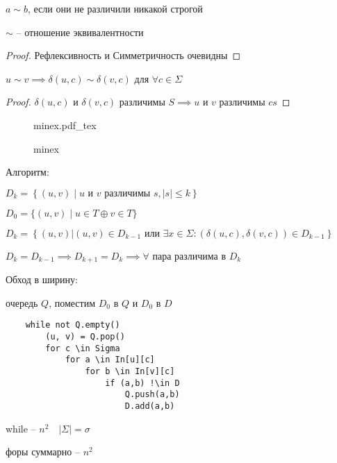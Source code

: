 \documentclass{book}
\theoremstyle{definition}
\newcommand{\incfig}[1]{%
    \def\svgwidth{\columnwidth}
    {#1.pdf_tex}
}
\begin{document}
$a\sim b$, если они не различили никакой строгой


\begin{lemma}
    $\sim $ -- отношение эквивалентности
\end{lemma}
\begin{proof}
    Рефлексивность и Симметричность очевидны

\end{proof}


\begin{lemma}
    $u\sim v \implies \delta(u,c) \sim \delta(v,c)$ для $\forall c\in \Sigma$        
\end{lemma}
\begin{proof}
    $\delta(u,c)$ и  $\delta(v,c)$ различимы  $S \implies u$ и $v$ различимы  $cs$
\end{proof}

\begin{figure}[!ht]
    \centering
    \incfig{minex}
    \caption{minex}
    \label{fig:minex}
\end{figure}

Алгоритм:

$D_k = \left\{ (u,v) \mid u \text{ и } v \text{ различимы } s, |s|\leqslant k \right\} $ 

$D_0 = \{(u,v) \mid u\in T \oplus v\in T\}$

$D_k = \left\{ (u,v)| (u,v)\in D_{k-1} \text{ или } \exists x\in \Sigma: \left( \delta(u,c), \delta(v,c) \right) \in D_{k-1} \right\} $ 

$D_k = D_{k-1} \implies D_{k+1} = D_k \implies  \forall $ пара различима в $D_k$

Обход в ширину:

очередь $Q$, поместим  $D_0$ в  $Q$ и $D_0$ в  $D$

 \begin{lstlisting}
    while not Q.empty()
        (u, v) = Q.pop()
        for c \in Sigma
            for a \in In[u][c]
                for b \in In[v][c]
                    if (a,b) !\in D
                        Q.push(a,b)
                        D.add(a,b)
\end{lstlisting}        

while -- $n^2\quad \left| \Sigma \right|  = \sigma$

форы суммарно -- $n^2$
\end{document}
